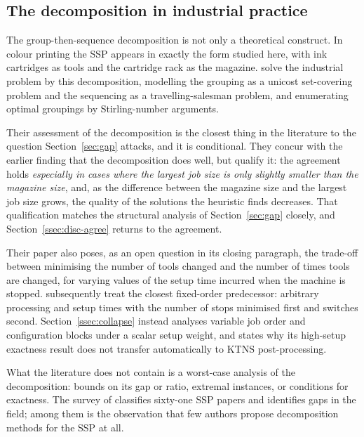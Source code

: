 \subsection{The decomposition in industrial practice}\label{ssec:sota-practice}

The group-then-sequence decomposition is not only a theoretical construct. In colour
printing the SSP appears in exactly the form studied here, with ink cartridges as
tools and the cartridge rack as the magazine. \citet{Burger2015} solve the industrial
problem by this decomposition, modelling the grouping as a unicost set-covering
problem and the sequencing as a travelling-salesman problem, and enumerating optimal
groupings by Stirling-number arguments.

Their assessment of the decomposition is the closest thing in the literature to the
question Section~\ref{sec:gap} attacks, and it is conditional. They concur with the
earlier finding that the decomposition does well, but qualify it: the agreement holds
\emph{especially in cases where the largest job size is only slightly smaller than
the magazine size}, and, as the difference between the magazine size and the largest
job size grows, the quality of the solutions the heuristic finds decreases. That
qualification matches the structural analysis of Section~\ref{sec:gap} closely, and
Section~\ref{ssec:disc-agree} returns to the agreement.

Their paper also poses, as an open question in its closing paragraph, the trade-off
between minimising the number of tools changed and the number of times tools are
changed, for varying values of the setup time incurred when the machine is stopped.
\citet{Furrer2017} subsequently treat the closest fixed-order predecessor: arbitrary
processing and setup times with the number of stops minimised first and switches
second. Section~\ref{ssec:collapse} instead analyses variable job order and
configuration blocks under a scalar setup weight, and states why its high-setup
exactness result does not transfer automatically to KTNS post-processing.

What the literature does not contain is a worst-case analysis of the decomposition:
bounds on its gap or ratio, extremal instances, or conditions for exactness. The
survey of \citet{Calmels2018} classifies sixty-one SSP papers and identifies gaps in
the field; among them is the observation that few authors propose decomposition
methods for the SSP at all.

